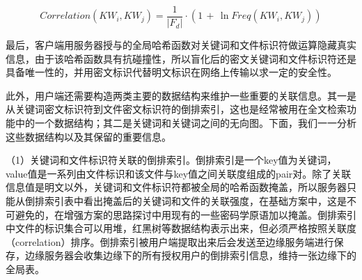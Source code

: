 \documentclass[promaster]{thesis-uestc}
\begin{document}
\begin{equation}
    Correlation(KW_i, KW_j) = \frac{1}{|F_d|} \cdot (1\,+\,\ln{Freq(KW_i, KW_j)})
    \label{关键词-关键词关联度公式}
\end{equation}

最后，客户端用服务器授与的全局哈希函数对关键词和文件标识符做运算隐藏真实信息，由于该哈希函数具有抗碰撞性，所以盲化后的密文关键词和文件标识符还是具备唯一性的，并用密文标识代替明文标识在网络上传输以求一定的安全性。

此外，用户端还需要构造两类主要的数据结构来维护一些重要的关联信息。其一是从关键词密文标识符到文件密文标识符的倒排索引，这也是经常被用在全文检索功能中的一个数据结构；其二是关键词和关键词之间的无向图。下面，我们一一分析这些数据结构以及其保留的重要信息。

（1）关键词和文件标识符关联的倒排索引。倒排索引是一个key值为关键词，value值是一系列由文件标识和该文件与key值之间关联度组成的pair对。除了关联信息值是明文以外，关键词和文件标识符都被全局的哈希函数掩盖，所以服务器只能从倒排索引表中看出掩盖后的关键词和文件的关联强度，在基础方案中，这是不可避免的，在增强方案的思路探讨中用现有的一些密码学原语加以掩盖。倒排索引中文件的标识集合可以用堆，红黑树等数据结构表示出来，但必须严格按照关联度（correlation）排序。倒排索引被用户端提取出来后会发送至边缘服务端进行保存，边缘服务器会收集边缘下的所有授权用户的倒排索引信息，维持一张边缘下的全局表。
\end{document}
